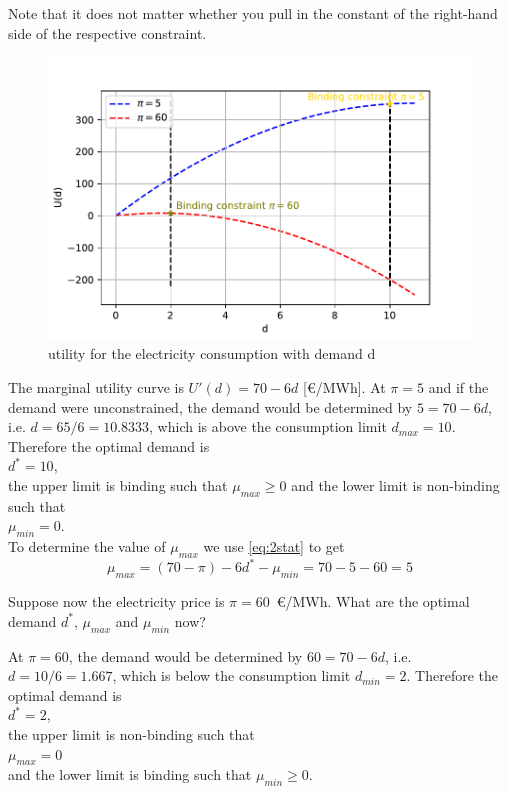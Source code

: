 \documentclass[11pt,a4paper,fleqn]{scrartcl}
\def\m{\mu}
\begin{document}
\begin{enumerate}[(a)]
 Note that it does not matter whether you pull in the constant of the right-hand side of the respective constraint.
\begin{figure}[h]
	\centering
	\includegraphics{graph_u_problem1.pdf}
	\caption{utility for the electricity consumption with demand d}
	\label{fig:solution04tutorial}
\end{figure}
 The marginal utility curve is $U'(d) = 70 - 6d$ [\euro/MWh]. At
 $\pi = 5$ and if the demand were unconstrained, the demand would be determined by $5=70-6d$, i.e. $d =
  65/6 = 10.8333$, which is above the consumption limit
 $d_{max} = 10$. Therefore the optimal demand is \\
  $d^* = 10$,\\
   the upper limit is binding such that $\mu_{max} \geq 0$ and the lower limit is non-binding such that\\
    $\mu_{min} = 0$. \\
 To determine the value of $\mu_{max}$ we use \eqref{eq:2stat} to get
 \begin{equation*}
	\m_{max} =  (70-\pi) - 6d^* - \mu_{min} =  70 - 5 -60 = 5
 \end{equation*}

 \begin{shaded}
  \item Suppose now the electricity price is $\pi = 60$~\euro/MWh. What are
  the optimal demand $d^*$, $\mu_{max}$ and $\mu_{min}$ now?
 \end{shaded}
 At $\pi = 60$, the demand would be determined by $60=70-6d$, i.e. $d = 10/6 = 1.667$, which is below the consumption limit $d_{min} = 2$. Therefore the optimal demand is \\
  $d^* = 2$,\\
   the upper limit is non-binding such that\\
    $\mu_{max}= 0$\\
 and the lower limit is binding such that $\mu_{min} \geq 0$.


\end{enumerate}
\end{document}
